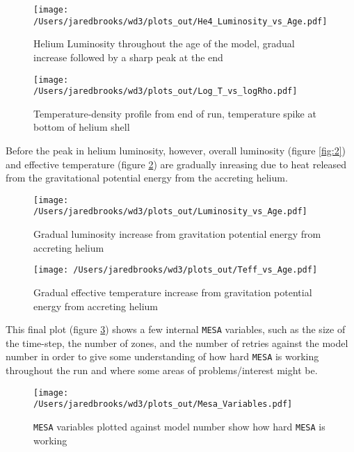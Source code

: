 \documentclass{article}
\begin{document}
        \begin{figure}[H]
          \begin{minipage}[b]{0.5\linewidth}
            \centering
            \texttt{[image: /Users/jaredbrooks/wd3/plots\_out/He4\_Luminosity\_vs\_Age.pdf]}
            \caption{Helium Luminosity throughout the age of the model, gradual increase followed by a sharp peak at the end}
            \label{fig:5}
          \end{minipage}
          \hspace{0cm}
          \begin{minipage}[b]{0.5\linewidth}
            \centering
            \texttt{[image: /Users/jaredbrooks/wd3/plots\_out/Log\_T\_vs\_logRho.pdf]}
            \caption{Temperature-density profile from end of run, temperature spike at bottom of helium shell}
            \label{fig:7}
          \end{minipage}
        \end{figure}

        \pagebreak

        Before the peak in helium luminosity, however, overall luminosity (figure \ref{fig:2}) and effective temperature (figure \ref{fig:3}) are gradually inreasing due to heat released from the gravitational potential energy from the accreting helium.

        \begin{figure}[H]
          \begin{minipage}[b]{0.5\linewidth}
            \centering
            \texttt{[image: /Users/jaredbrooks/wd3/plots\_out/Luminosity\_vs\_Age.pdf]}
            \caption{\footnotesize Gradual luminosity increase from gravitation potential energy from accreting helium}
            \label{fig:2}
          \end{minipage}
          \hspace{0cm}
          \begin{minipage}[b]{0.5\linewidth}
            \centering
            \texttt{[image: /Users/jaredbrooks/wd3/plots\_out/Teff\_vs\_Age.pdf]}
            \caption{\footnotesize Gradual effective temperature increase from gravitation potential energy from accreting helium}
            \label{fig:3}
          \end{minipage}
        \end{figure}

        \pagebreak

        This final plot (figure \ref{fig:6}) shows a few internal \texttt{MESA} variables, such as the size of the time-step, the number of zones, and the number of retries against the model number in order to give some understanding of how hard \texttt{MESA} is working throughout the run and where some areas of problems/interest might be.

        \begin{figure}[H]
                \centering
                \texttt{[image: /Users/jaredbrooks/wd3/plots\_out/Mesa\_Variables.pdf]}
                \caption{\texttt{MESA} variables plotted against model number show how hard \texttt{MESA} is working}
                \label{fig:6}
        \end{figure}
\end{document}
